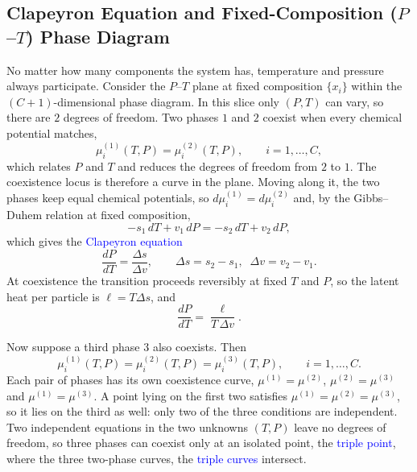 \subsection{Clapeyron Equation and Fixed-Composition ($P$--$T$) Phase Diagram}
No matter how many components the system has, temperature and pressure always
participate. Consider the $P$--$T$ plane at fixed composition $\{x_i\}$ within the
$(C+1)$-dimensional phase diagram. In this slice only $(P,T)$ can vary, so there
are $2$ degrees of freedom. Two phases $1$ and $2$ coexist when every chemical
potential matches,
\begin{equation*}
    \mu_i^{(1)}(T,P) = \mu_i^{(2)}(T,P), \qquad i=1,\dots,C,
\end{equation*}
which relates $P$ and $T$ and reduces the degrees of freedom from $2$ to $1$.
The coexistence locus is therefore a curve in the plane. Moving along it, the two
phases keep equal chemical potentials, so $d\mu_i^{(1)}=d\mu_i^{(2)}$ and, by
the Gibbs--Duhem relation at fixed composition,
\begin{equation*}
    -s_1\,dT + v_1\,dP = -s_2\,dT + v_2\,dP ,
\end{equation*}
which gives the \textcolor{blue}{Clapeyron equation}
\begin{equation}
    \boxed{\frac{dP}{dT}=\frac{\Delta s}{\Delta v}}, \qquad
    \Delta s = s_2-s_1,\;\; \Delta v = v_2-v_1 .
\end{equation}
At coexistence the transition proceeds reversibly at fixed $T$ and $P$, so the
latent heat per particle is $\ell = T\Delta s$, and
\begin{equation}
    \boxed{\frac{dP}{dT}=\frac{\ell}{T\,\Delta v}.}
\end{equation}

Now suppose a third phase $3$ also coexists. Then
\begin{equation*}
    \mu_i^{(1)}(T,P)=\mu_i^{(2)}(T,P)=\mu_i^{(3)}(T,P), \qquad i=1,\dots,C .
\end{equation*}
Each pair of phases has its own coexistence curve, $\mu^{(1)}=\mu^{(2)}$,
$\mu^{(2)}=\mu^{(3)}$ and $\mu^{(1)}=\mu^{(3)}$. A point lying on the first two
satisfies $\mu^{(1)}=\mu^{(2)}=\mu^{(3)}$, so it lies on the third as well:
only two of the three conditions are independent. Two independent equations in the
two unknowns $(T,P)$ leave no degrees of freedom, so three phases can coexist
only at an isolated point, the \textcolor{blue}{triple point}, where the three
two-phase curves, the \textcolor{blue}{triple curves} intersect.

